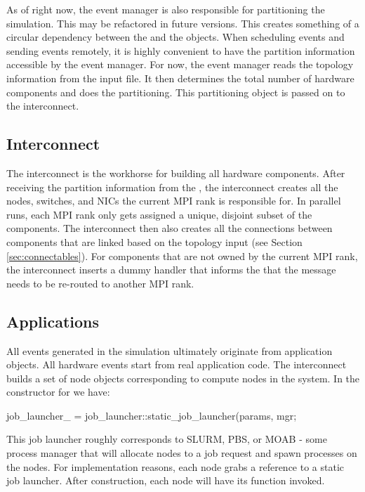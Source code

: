 As of right now, the event manager is also responsible for partitioning the simulation.
This may be refactored in future versions.
This creates something of a circular dependency between the  and the  objects.
When scheduling events and sending events remotely,
it is highly convenient to have the partition information accessible by the event manager.
For now, the event manager reads the topology information from the input file.
It then determines the total number of hardware components and does the partitioning.
This partitioning object is passed on to the interconnect.

\subsection{Interconnect}\label{subsec:interconnect}
The interconnect is the workhorse for building all hardware components.
After receiving the partition information from the ,
the interconnect creates all the nodes, switches, and NICs the current MPI rank is responsible for.
In parallel runs, each MPI rank only gets assigned a unique, disjoint subset of the components.
The interconnect then also creates all the connections between components that are linked based on the topology input (see Section \ref{sec:connectables}).
For components that are not owned by the current MPI rank, the interconnect inserts a dummy handler that informs the 
that the message needs to be re-routed to another MPI rank.

\subsection{Applications}\label{subsec:apps}
All events generated in the simulation ultimately originate from application objects.
All hardware events start from real application code.
The interconnect builds a set of node objects corresponding to compute nodes in the system.
In the constructor for  we have:

\begin{CppCode}
job_launcher_ = job_launcher::static_job_launcher(params, mgr;
\end{CppCode}

This job launcher roughly corresponds to SLURM, PBS, or MOAB - some process manager that will allocate nodes to a job request and spawn processes on the nodes. For implementation reasons, each node grabs a reference to a static job launcher.  After construction, each node will have its  function invoked.

